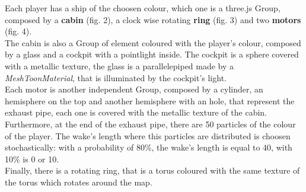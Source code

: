 \documentclass[11pt]{article}
\begin{document}
	
	Each player has a ship of the choosen colour, which one is a three.js Group, composed by a \textbf{cabin} (fig. 2), a clock wise rotating \textbf{ring} (fig. 3) and two \textbf{motors} (fig. 4).\\
	
	The cabin is also a Group of element coloured with the player's colour, composed by a glass and a cockpit with a pointlight inside.
	The cockpit is a sphere covered with a metallic texture, the glass is a parallelepiped made by a \textit{MeshToonMaterial}, that is illuminated by the cockpit's light.\\
	
	Each motor is another independent Group, composed by a cylinder, an hemisphere on the top and another hemisphere with an hole, that represent the exhaust pipe, each one is covered with the metallic texture of the cabin.
	Furthermore, at the end of the exhaust pipe, there are 50 particles of the colour of the player. The wake's length where this particles are distributed is choosen stochastically: with a probability of 80\%, the wake's length is equal to 40, with 10\% is 0 or 10.\\
	
	Finally, there is a rotating ring, that is a torus coloured with the same texture of the torus which rotates around the map.
	
\end{document}
